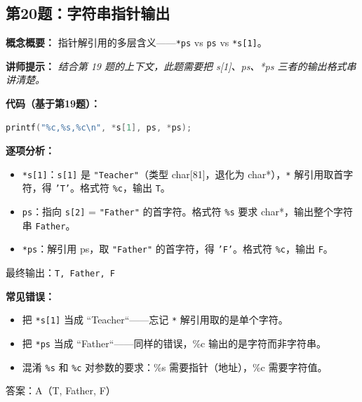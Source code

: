 \subsection{第20题：字符串指针输出}

\textbf{概念概要：} 指针解引用的多层含义——\texttt{*ps} vs \texttt{ps} vs \texttt{*s[1]}。

\medskip
\textbf{讲师提示：} \textit{结合第 19 题的上下文，此题需要把 s[1]、ps、*ps 三者的输出格式串讲清楚。}

\textbf{代码（基于第19题）：}
\begin{lstlisting}[language=C]
printf("%c,%s,%c\n", *s[1], ps, *ps);
\end{lstlisting}

\textbf{逐项分析：}
\begin{itemize}
    \item \texttt{*s[1]}：\texttt{s[1]} 是 \texttt{"Teacher"}（类型 char[81]，退化为 char*），\texttt{*} 解引用取首字符，得 \texttt{'T'}。格式符 \texttt{\%c}，输出 \texttt{T}。
    \item \texttt{ps}：指向 \texttt{s[2]} = \texttt{"Father"} 的首字符。格式符 \texttt{\%s} 要求 char*，输出整个字符串 \texttt{Father}。
    \item \texttt{*ps}：解引用 ps，取 \texttt{"Father"} 的首字符，得 \texttt{'F'}。格式符 \texttt{\%c}，输出 \texttt{F}。
\end{itemize}

\noindent 最终输出：\texttt{T, Father, F}

\textbf{常见错误：}
\begin{itemize}
    \item 把 \texttt{*s[1]} 当成 “Teacher“——忘记 \texttt{*} 解引用取的是单个字符。
    \item 把 \texttt{*ps} 当成 “Father“——同样的错误，\%c 输出的是字符而非字符串。
    \item 混淆 \texttt{\%s} 和 \texttt{\%c} 对参数的要求：\%s 需要指针（地址），\%c 需要字符值。
\end{itemize}

{\color{highlight}答案：A（T, Father, F）}

